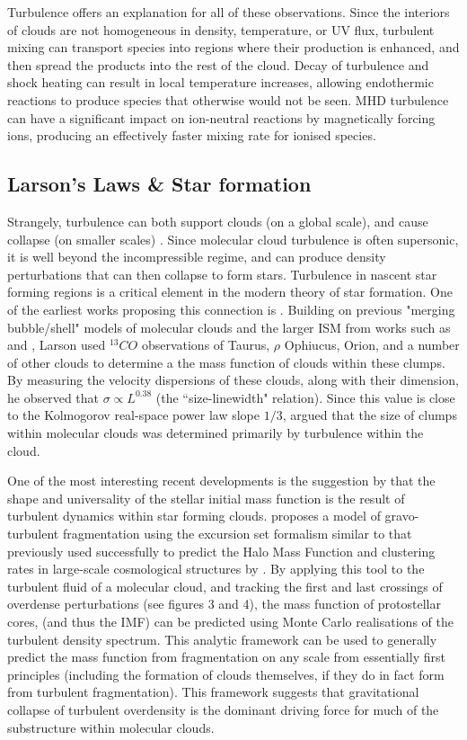 \documentclass[12pt, preprint]{aastex}
\begin{document}
Turbulence offers an explanation for all of these observations.  Since the
interiors of clouds are not homogeneous in density, temperature, or UV flux,
turbulent mixing can transport species into regions where their production is
enhanced, and then spread the products into the rest of the cloud.  Decay of
turbulence and shock heating can result in local temperature increases, allowing 
endothermic reactions to produce species that otherwise would not be 
seen\citep{xie1995}.  MHD turbulence
can have a significant impact on ion-neutral reactions by magnetically forcing
ions, producing an effectively faster mixing rate for ionised species.
\subsection{Larson's Laws \& Star formation}
Strangely, turbulence can both support clouds (on a global scale), and cause
collapse (on smaller scales) \citep{mac2004}.  Since molecular cloud
turbulence is often supersonic, it is well beyond the incompressible regime,
and can produce density perturbations that can then collapse to form
stars\citep{elm2004}. Turbulence in nascent star forming 
regions is a critical element in the modern theory 
of star formation. One of the earliest works proposing this connection is
\citet{larson1981}.  Building on previous "merging bubble/shell" models of
molecular clouds and the larger ISM from works such as \citet{norman1980} and
\citet{mckee1977}, Larson used $^{13}CO$ observations of Taurus, $\rho$
Ophiucus, Orion, and a number of other clouds to determine a the mass function
of clouds within these clumps.  By measuring the velocity dispersions of these
clouds, along with their dimension, he observed that $\sigma \propto L^{0.38}$
(the ``size-linewidth" relation).  Since this value is close to the Kolmogorov
real-space power law slope $1/3$, \citet{larson1981} argued that the size of
clumps within molecular clouds was determined primarily by turbulence within
the cloud.

One of the most interesting recent developments is the suggestion by
\citet{hopk2013} that the
shape and universality of the stellar initial mass function is the result of 
turbulent dynamics within
star forming clouds. \citet{hopk2013} proposes a model of gravo-turbulent
fragmentation using the excursion set formalism similar to that previously used 
successfully to predict the Halo Mass Function and clustering rates in
large-scale cosmological structures by \citet{press1974}.  By applying this tool
to the turbulent fluid of a molecular cloud, and tracking the first and last
crossings of overdense perturbations (see figures 3 and 4), the mass function of
protostellar cores, (and thus the IMF) can be predicted using Monte Carlo
realisations of the turbulent density spectrum.  This analytic framework
can be used to generally predict the mass function from fragmentation
on any scale from essentially first principles (including the formation 
of clouds themselves, if they do in fact
form from turbulent fragmentation).  This framework suggests that gravitational
collapse of turbulent overdensity is the dominant driving force for much of the
substructure within molecular clouds.
\end{document}
